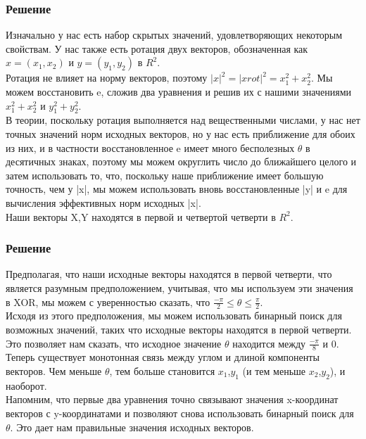\documentclass[t]{beamer}
\begin{document}
\begin{frame}[c]
	\frametitle{Решение} 
		 \begin{block}{}
		     {Изначально у нас есть набор скрытых значений, удовлетворяющих некоторым свойствам. У нас также есть ротация двух векторов, обозначенная как \(x = (x_1,x_2)\) и \(y = (y_1,y_2)\)  в  \(R^2\). \\ Ротация не влияет на норму векторов, поэтому \(|x|^2 = |xrot|^2 = x_1^2 + x_2^2\). Мы можем восстановить e, сложив два уравнения и решив их с нашими значениями \(x_1^2 + x_2^2\) и \(y_1^2 + y_2^2\). \\ В теории, поскольку ротация выполняется над вещественными числами, у нас нет точных значений норм исходных векторов, но у нас есть приближение для обоих из них, и в частности восстановленное e имеет много бесполезных \(\theta\) в десятичных знаках, поэтому мы можем округлить число до ближайшего целого и затем использовать то, что, поскольку наше приближение имеет большую точность, чем у |x|, мы можем использовать вновь восстановленные |y| и e для вычисления эффективных норм исходных |x|. \\ Наши векторы X,Y находятся в первой и четвертой четверти в \(R^2\).}
          \end{block}
\end{frame}

\begin{frame}[c]
	\frametitle{Решение} 
		 \begin{block}{}
		     {Предполагая, что наши исходные векторы находятся в первой четверти, что является разумным предположением, учитывая, что мы используем эти значения в XOR, мы можем с уверенностью сказать, что \(\frac{-\pi}{2} \leq \theta \leq \frac{\pi}{2}\). \\ Исходя из этого предположения, мы можем использовать бинарный поиск для возможных значений, таких что исходные векторы находятся в первой четверти. Это позволяет нам сказать, что исходное значение \(\theta\) находится между \(\frac{-\pi}{8}\) и 0. Теперь существует монотонная связь между углом и длиной компоненты векторов. Чем меньше $\theta$, тем больше становится $x_1$,$y_1$ (и тем меньше $x_2$,$y_2$), и наоборот. \\ Напомним, что первые два уравнения точно связывают значения x-координат векторов с y-координатами и позволяют снова использовать бинарный поиск для \(\theta\). Это дает нам правильные значения исходных векторов.}
          \end{block}
\end{frame}
\end{document}
